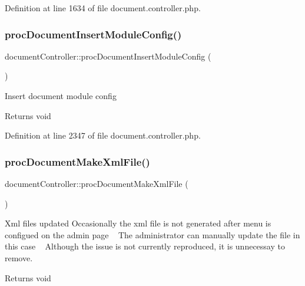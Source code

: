 Definition at line 1634 of file document.\+controller.\+php.

\hypertarget{classdocumentController_aede408d35ea6622dfa1b39ec52f84e44}{}\label{classdocumentController_aede408d35ea6622dfa1b39ec52f84e44} 
\subsubsection{\texorpdfstring{proc\+Document\+Insert\+Module\+Config()}{procDocumentInsertModuleConfig()}}
{\footnotesize\ttfamily document\+Controller\+::proc\+Document\+Insert\+Module\+Config (\begin{DoxyParamCaption}{ }\end{DoxyParamCaption})}

Insert document module config \begin{DoxyReturn}{Returns}
void 
\end{DoxyReturn}


Definition at line 2347 of file document.\+controller.\+php.

\hypertarget{classdocumentController_a749d60be23e4645a5656a82a4fae1962}{}\label{classdocumentController_a749d60be23e4645a5656a82a4fae1962} 
\subsubsection{\texorpdfstring{proc\+Document\+Make\+Xml\+File()}{procDocumentMakeXmlFile()}}
{\footnotesize\ttfamily document\+Controller\+::proc\+Document\+Make\+Xml\+File (\begin{DoxyParamCaption}{ }\end{DoxyParamCaption})}

Xml files updated Occasionally the xml file is not generated after menu is configued on the admin page ~\newline
The administrator can manually update the file in this case ~\newline
Although the issue is not currently reproduced, it is unnecessay to remove. \begin{DoxyReturn}{Returns}
void 
\end{DoxyReturn}


